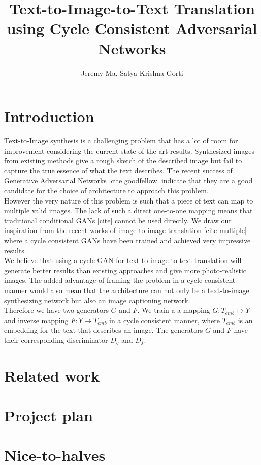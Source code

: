 \documentclass[]{article}
\title{Text-to-Image-to-Text Translation using Cycle Consistent Adversarial Networks}
\author{Jeremy Ma, Satya Krishna Gorti}
\date{}
\begin{document}
\maketitle

\begin{abstract}

\end{abstract}

\section{Introduction}

Text-to-Image synthesis is a challenging problem that has a lot of room for improvement considering the current state-of-the-art results. Synthesized images from existing methods give a rough sketch of the described image but fail to capture the true essence of what the text describes. The recent success of Generative Adversarial Networks [cite goodfellow] indicate that they are a good candidate for the choice of architecture to approach this problem.
\\

However the very nature of this problem is such that a piece of text can map to multiple valid images. The lack of such a direct one-to-one mapping means that traditional conditional GANs [cite] cannot be used directly. We draw our inspiration from the recent works of image-to-image translation [cite multiple] where a cycle consistent GANs have been trained and achieved very impressive results.
\\

We believe that using a cycle GAN for text-to-image-to-text translation will generate better results than existing approaches and give more photo-realistic images. The added advantage of framing the problem in a cycle consistent manner would also mean that the architecture can not only be a text-to-image synthesizing network but also an image captioning network.
\\

Therefore we have two generators $G$ and $F$. We train a a mapping $G: T_{emb} \mapsto Y$ and inverse mapping $F: Y \mapsto T_{emb}$ in a cycle consistent manner, where $T_{emb}$ is an embedding for the text that describes an image. The generators $G$ and $F$ have their corresponding discriminator $D_g$ and $D_f$.

\section{Related work}

\section{Project plan}

\section{Nice-to-halves}
\end{document}
